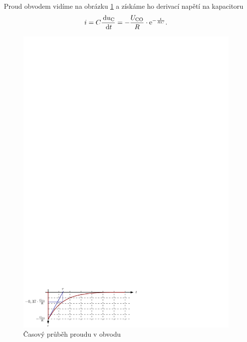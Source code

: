 Proud obvodem vidíme na obrázku \ref{fig:prvni_rad_rc_graf_i} a získáme ho derivací napětí na kapacitoru
$$
i = C \frac{\,\mathrm{d} u_\mathrm{C}}{\,\mathrm{d} t} = - \frac{U_\mathrm{CO}}{R} \cdot \mathrm{e}^{-\frac{t}{RC}}.
$$
\begin{figure}[h!]
\centering
\includegraphics[]{prechodne_jevy/prvni_rad/rc_graf_i.pdf}
\caption{Časový průběh proudu v obvodu}
\label{fig:prvni_rad_rc_graf_i}
\end{figure}

